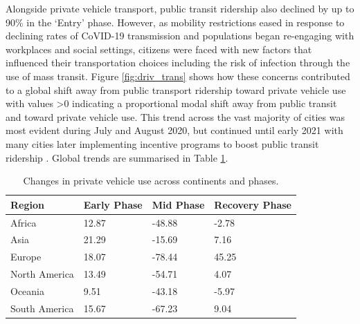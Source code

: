 \documentclass[preprint,12pt]{elsarticle}
\begin{document}
Alongside private vehicle transport, public transit ridership also declined by up to 90\% in the `Entry' phase\cite{TransitCovid_Gkiotsalitis}. However, as mobility restrictions eased in response to declining rates of CoVID-19 transmission and populations began re-engaging with workplaces and social settings, citizens were faced with new factors that influenced their transportation choices including the risk of infection through the use of mass transit\cite{BECKTransit}. Figure \ref{fig:driv_trans} shows how these concerns contributed to a global shift away from public transport ridership toward private vehicle use with values \textgreater 0 indicating a proportional modal shift away from public transit and toward private vehicle use. This trend across the vast majority of cities was most evident during July and August 2020, but continued until early 2021 with many cities later implementing incentive programs to boost public transit ridership \cite{dai2021improving}. Global trends are summarised in Table \ref{tab:driving}.

\begin{table}
\caption{Changes in private vehicle use across continents and phases.}
\begin{tabular}{ |l|l|l|l| }
\hline
\textbf{Region} & \textbf{Early Phase} & \textbf{Mid Phase} & \textbf{Recovery Phase}  \\ 
\hline
Africa         & \cellcolor{red!12}12.87 & \cellcolor{blue!15}-48.88 & \cellcolor{blue!10}-2.78  \\ \hline
Asia           & \cellcolor{red!15}21.29 & \cellcolor{blue!10}-15.69 & \cellcolor{red!10} 7.16  \\ \hline
Europe         & \cellcolor{red!13}18.07 & \cellcolor{blue!20}-78.44 & \cellcolor{red!25} 45.25  \\ \hline
North America  & \cellcolor{red!12}13.49 & \cellcolor{blue!16}-54.71 & \cellcolor{red!10}4.07  \\ \hline
Oceania        &  \cellcolor{red!10}9.51 & \cellcolor{blue!15}-43.18 & \cellcolor{blue!10}-5.97  \\ \hline
South America  & \cellcolor{red!12}15.67 & \cellcolor{blue!18}-67.23 & \cellcolor{red!10}9.04  \\ \hline
\end{tabular}\label{tab:driving}
\end{table}
\end{document}
